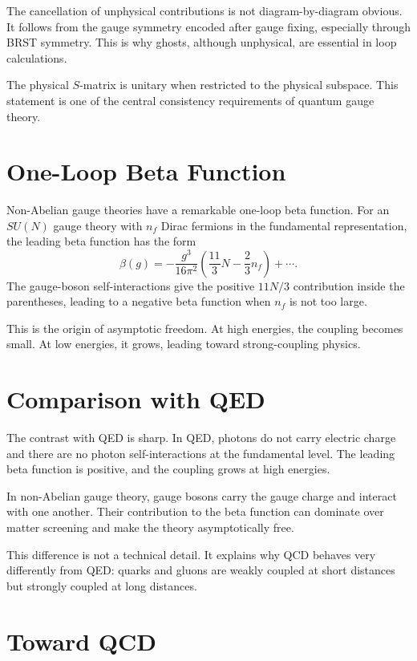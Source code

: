 The cancellation of unphysical contributions is not diagram-by-diagram obvious.
It follows from the gauge symmetry encoded after gauge fixing, especially through
BRST symmetry. This is why ghosts, although unphysical, are essential in loop
calculations.

The physical \(S\)-matrix is unitary when restricted to the physical subspace.
This statement is one of the central consistency requirements of quantum gauge
theory.

\section{One-Loop Beta Function}

Non-Abelian gauge theories have a remarkable one-loop beta function. For an
\(SU(N)\) gauge theory with \(n_f\) Dirac fermions in the fundamental
representation, the leading beta function has the form
\[
    \beta(g)
    = -\frac{g^3}{16\pi^2}
      \left(\frac{11}{3}N-\frac{2}{3}n_f\right)+\cdots.
\]
The gauge-boson self-interactions give the positive \(11N/3\) contribution
inside the parentheses, leading to a negative beta function when \(n_f\) is not
too large.

This is the origin of asymptotic freedom. At high energies, the coupling becomes
small. At low energies, it grows, leading toward strong-coupling physics.

\section{Comparison with QED}

The contrast with QED is sharp. In QED, photons do not carry electric charge and
there are no photon self-interactions at the fundamental level. The leading beta
function is positive, and the coupling grows at high energies.

In non-Abelian gauge theory, gauge bosons carry the gauge charge and interact
with one another. Their contribution to the beta function can dominate over
matter screening and make the theory asymptotically free.

This difference is not a technical detail. It explains why QCD behaves very
differently from QED: quarks and gluons are weakly coupled at short distances but
strongly coupled at long distances.

\section{Toward QCD}

